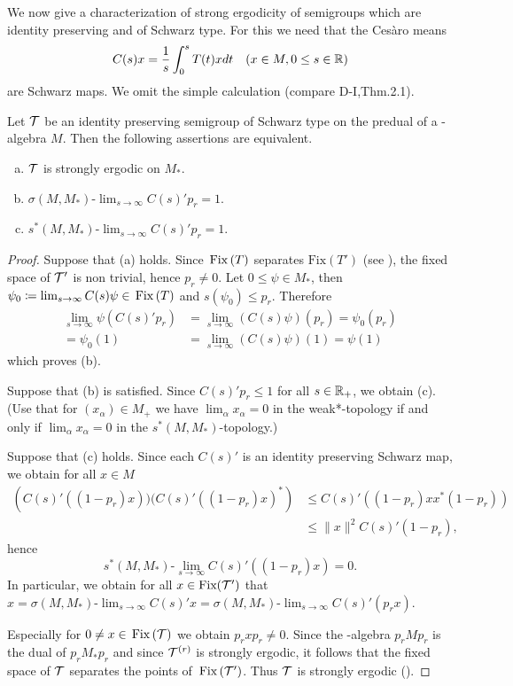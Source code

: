 We now give a characterization of strong ergodicity of semigroups which are identity preserving and of Schwarz type.
For this we need that the Cesàro means
\[
C(s)x = \frac{1}{s}\int_{0}^{s} T(t)xdt \quad (x \in M, 0 \leq s \in \mathbb{R})
\]
are Schwarz maps.
We omit the simple calculation (compare D-I,Thm.2.1).
\begin{proposition}\label{prop:d4-3.3}
Let $\mathcal{T}$ be an identity preserving semigroup of Schwarz type on the predual of a \WA-algebra $M$.
Then the following assertions are equivalent.
\begin{enumerate}[(a)]
\item
$\mathcal{T}$ is strongly ergodic on $M_{*}$.

\item
$\sigma(M,M_{*})\text{-}\lim_{s \to \infty} C(s)'p_{r} = 1$.

\item
$s^{*}(M,M_{*})\text{-}\lim_{s \to \infty} C(s)'p_{r} = 1$.
\end{enumerate}
\end{proposition}
\begin{proof}
Suppose that (a) holds.
Since $\mathop{}\mathrm{Fix}\left(T\right)$ separates $\text{Fix}(T')$ (see \citet[Chap.2,Thm.1.4]{krengel:1985}), the fixed space of $\mathcal{T}'$ is non trivial, hence $p_{r} \neq 0$.
Let $0 \leq \psi \in M_{*}$, then $\psi_{0} \coloneqq \lim_{s \to \infty} C(s)\psi \in \mathop{}\mathrm{Fix}\left(T\right)$ and $s(\psi_{0}) \leq p_{r}$.
Therefore
\begin{align*}
\lim_{s \to \infty} \psi(C(s)'p_{r}) &= \lim_{s \to \infty} (C(s)\psi)(p_{r})  = \psi_{0}(p_{r})  \\
= \psi_{0}(1) &= \lim_{s \to \infty} (C(s)\psi)(1) = \psi(1)
\end{align*}
which proves (b).

Suppose that (b) is satisfied.
Since $C(s)'p_{r} \leq 1$ for all $s \in \mathbb{R}_{+}$, we obtain (c).
(Use that for $(x_{\alpha}) \in M_{+}$ we have $\lim_{\alpha}x_{\alpha} = 0$ in the weak*-topology if and only if $\lim_{\alpha}x_{\alpha} = 0$ in the $s^{*}(M,M_{*})$-topology.)

Suppose that (c) holds.
Since each $C(s)'$ is an identity preserving Schwarz map, we obtain for all $x \in M$
\begin{align*}
	\left( C(s)'((1-p_{r})x))(C(s)'((1-p_{r})x)^{*} \right) 
			&\leq C(s)'((1-p_{r})xx^{*}(1-p_{r}))  \\
 	&\leq \|x\|^2 C(s)'(1-p_{r}),
\end{align*}
hence
\[
s^{*}(M,M_{*})\text{-}\lim_{s \to \infty} C(s)'((1-p_{r})x) = 0.
\]
In particular, we obtain for all $x \in \text{Fix}(\mathcal{T}')$ that $x = \sigma(M,M_{*})\text{-}\lim_{s \to \infty} C(s)'x = \sigma(M,M_{*})\text{-}\lim_{s \to \infty} C(s)'(p_{r}x)$.

Especially for $0 \neq x \in \mathop{}\mathrm{Fix}\left(\mathcal{T}\right)$ we obtain $p_{r}xp_{r} \neq 0$.
Since the \WA-algebra $p_{r}Mp_{r}$ is the dual of $p_{r}M_{*}p_{r}$ and since $\mathcal{T}^{(r)}$ is strongly ergodic, it follows that the fixed space of\/ $\mathcal{T}$ separates the points of $\mathop{}\mathrm{Fix}\left(\mathcal{T}'\right)$.
Thus $\mathcal{T}$ is strongly ergodic (\citet[Chap. 2, Thm. 1.4]{krengel:1985}).
\end{proof}
